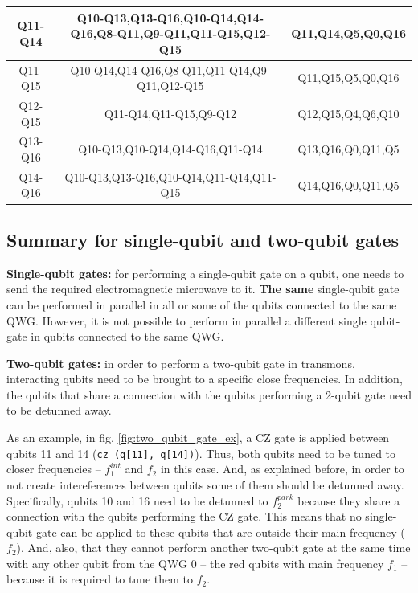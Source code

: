 \documentclass[11pt]{article}
\begin{document}
\begin{table}[h!]
{\begin{tabular}{|c|c|c|}
\hline
Q11-Q14 & Q10-Q13,Q13-Q16,Q10-Q14,Q14-Q16,Q8-Q11,Q9-Q11,Q11-Q15,Q12-Q15 & Q11,Q14,Q5,Q0,Q16\\
\hline
Q11-Q15 & Q10-Q14,Q14-Q16,Q8-Q11,Q11-Q14,Q9-Q11,Q12-Q15 & Q11,Q15,Q5,Q0,Q16\\
\hline
Q12-Q15 & Q11-Q14,Q11-Q15,Q9-Q12 & Q12,Q15,Q4,Q6,Q10\\
\hline
Q13-Q16 & Q10-Q13,Q10-Q14,Q14-Q16,Q11-Q14  & Q13,Q16,Q0,Q11,Q5\\
\hline
Q14-Q16 & Q10-Q13,Q13-Q16,Q10-Q14,Q11-Q14,Q11-Q15 & Q14,Q16,Q0,Q11,Q5\\
\hline
\end{tabular}
}
\end{table}

\subsection{Summary for single-qubit and two-qubit gates}

\textbf{Single-qubit gates:} for performing a single-qubit gate on a qubit, one needs to send the required electromagnetic microwave to it.  \textbf{The same} single-qubit gate can be performed in parallel in all or some of the qubits connected to the same QWG. However, it is not possible to perform in parallel a different single qubit-gate in qubits connected to the same QWG.

\textbf{Two-qubit gates:} in order to perform a two-qubit gate in transmons, interacting qubits need to be brought to a specific close frequencies. In addition, the qubits that share a connection with the qubits performing a 2-qubit gate need to be detunned away. %

As an example, in fig. \ref{fig:two_qubit_gate_ex}, a CZ gate is applied between qubits 11 and 14 (\texttt{cz (q[11], q[14])}). Thus, both qubits need to be tuned to closer frequencies -- $f_1^{int}$ and $f_2$ in this case. And, as explained before, in order to not create intereferences between qubits some of them should be detunned away. Specifically, qubits 10 and 16 need to be detunned to $f_2^{park}$ because they share a connection with the qubits performing the CZ gate. This means that no single-qubit gate can be applied to these qubits that are outside their main frequency ($f_2$). And, also, that they cannot perform another two-qubit gate at the same time with any other qubit from the QWG 0 -- the red qubits with main frequency $f_1$ -- because it is required to tune them to $f_2$.
\end{document}
